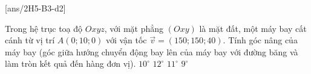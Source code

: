 \baitaptn
\setcounter{ex}{0}
[ans/2H5-B3-d2]

\begin{ex}
		Trong hệ trục toạ độ $Oxyz$, với mặt phẳng $(Ox y)$ là mặt đất, một máy bay cất cánh từ vị trí $A(0; 10; 0)$ với vận tốc $\vec{v}=(150; 150; 40)$. Tính góc nâng của máy bay (góc giữa hướng chuyển động bay lên của máy bay với đường băng và làm tròn kết quả đến hàng đơn vị).
		\choice
		{$10^{\circ}$}
		{$12^{\circ}$}
		{\True $11^{\circ}$}
		{$9^{\circ}$}
\end{ex}


